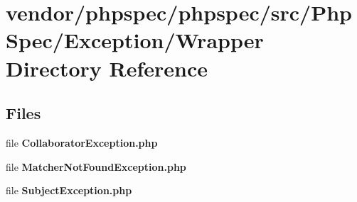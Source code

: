 \section{vendor/phpspec/phpspec/src/\+Php\+Spec/\+Exception/\+Wrapper Directory Reference}
\label{dir_2981f0b39410977cbecceb89e0a9d914}
\subsection*{Files}
\begin{DoxyCompactItemize}
\item 
file {\bf Collaborator\+Exception.\+php}
\item 
file {\bf Matcher\+Not\+Found\+Exception.\+php}
\item 
file {\bf Subject\+Exception.\+php}
\end{DoxyCompactItemize}
